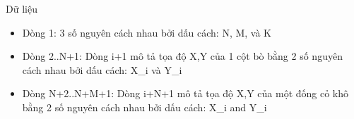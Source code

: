 Dữ liệu
\begin{itemize}
	\item     Dòng 1: 3 số nguyên cách nhau bởi dấu cách: N, M, và K   
	\item     Dòng 2..N+1: Dòng i+1 mô tả tọa độ X,Y của 1 cột bò         bằng 2 số nguyên cách nhau bởi dấu cách: X\_i và Y\_i   
	\item     Dòng N+2..N+M+1: Dòng i+N+1 mô tả tọa độ X,Y của một         đống cỏ khô bằng 2 số nguyên cách nhau bởi dấu cách: X\_i and Y\_i   
\end{itemize}